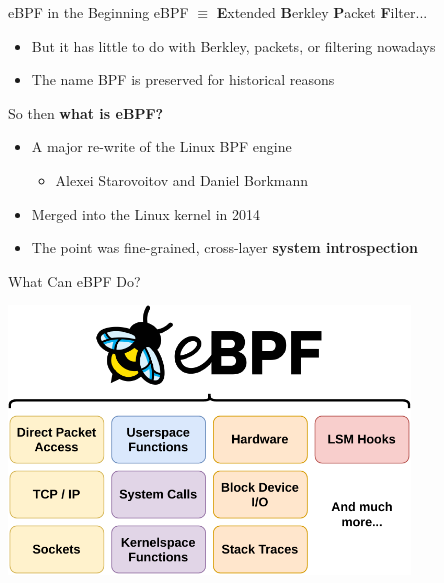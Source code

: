 \documentclass[12pt, dvipsnames]{beamer}
\begin{document}
\begin{frame}[c]{eBPF in the Beginning}
eBPF $\equiv$ \textbf{E}xtended \textbf{B}erkley \textbf{P}acket \textbf{F}ilter...
\begin{itemize}
    \item But it has little to do with Berkley, packets, or filtering nowadays
    \item The name BPF is preserved for historical reasons
\end{itemize}
\vfill
So then \textbf{what is eBPF?}
\begin{itemize}
    \item A major re-write of the Linux BPF engine
    \begin{itemize}
        \item Alexei Starovoitov and Daniel Borkmann
    \end{itemize}
    \item Merged into the Linux kernel in 2014
    \item The point was fine-grained, cross-layer \textbf{system introspection}
\end{itemize}
\end{frame}

\begin{frame}[c]{What Can eBPF Do?}
\begin{center}
    \color{black}
    \includegraphics[width=0.8\textwidth]{figs/ebpf-overview.pdf}
\end{center}
\end{frame}
\end{document}
